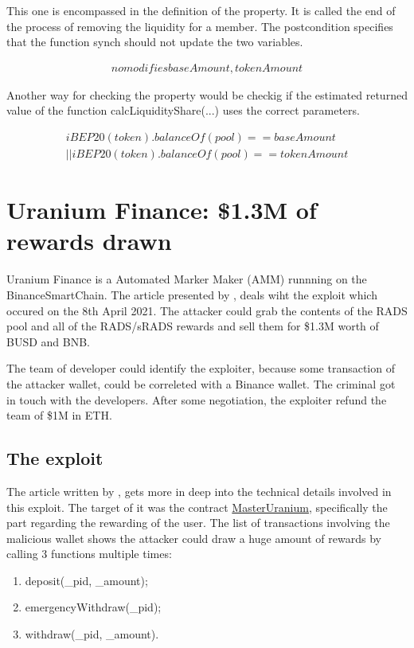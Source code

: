 This one is encompassed in the definition of the property. 
It is called the end of the process of removing the liquidity for a member. 
The postcondition specifies that the function synch should not update the two variables.  

\begin{equation}
    \begin{split}
        no modifies baseAmount, tokenAmount
    \end{split}
\end{equation}

Another way for checking the property would be checkig if the estimated returned value of the function calcLiquidityShare(...) uses the correct parameters.

\begin{equation}
    \begin{split}
        iBEP20(token).balanceOf(pool) == baseAmount \\
        || iBEP20(token).balanceOf(pool) == tokenAmount
    \end{split}
\end{equation}

\section{Uranium Finance: \$1.3M of rewards drawn}   
\label{sec:Exploits:Uranium}
Uranium Finance is a Automated Marker Maker (AMM) runnning on the BinanceSmartChain.
The article presented by \citet{UraniumPM}, deals wiht the exploit which occured on the 
8th April 2021. The attacker could grab the contents of the RADS pool and all of the RADS/sRADS rewards 
and sell them for \$1.3M worth of BUSD and BNB.

The team of developer could identify the exploiter, because some transaction of the attacker wallet, could be 
correleted with a Binance wallet. The criminal got in touch with the developers. After some negotiation, 
the exploiter refund the team of \$1M in ETH.

\subsection{The exploit}
\label{sec:Uranium:Exploit}


The article written by \citeauthor{UraniumTech}, gets more in deep into the technical details involved in this exploit.
The target of it was the contract \href{https://bscscan.com/address/0xd5aac41d315c1d382dcf1c39d4ed9b37c224edf2#code}{MasterUranium}, specifically the part regarding the rewarding of the user.
The list of transactions involving the malicious wallet shows the attacker could draw a huge amount of rewards 
by calling 3 functions multiple times:
\begin{enumerate}
    \item deposit(\_pid, \_amount); 
    \item emergencyWithdraw(\_pid); 
    \item withdraw(\_pid, \_amount).
\end{enumerate}


